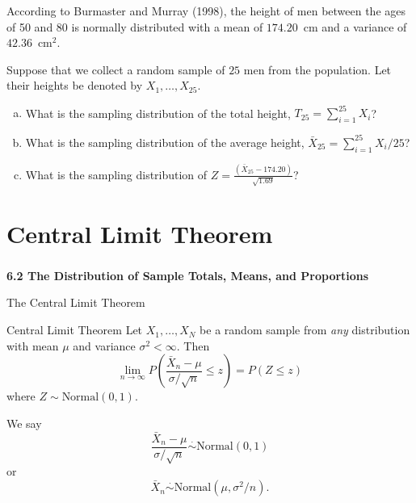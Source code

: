 \begin{frame}

  \begin{block}{\example}
    According to Burmaster and Murray (1998), the height of men between the ages of 50 and 80 is normally distributed with a mean of $174.20$~cm and a variance of $42.36$~cm$^2$.

    \bigskip
    
    Suppose that we collect a random sample of $25$ men from the population. Let their heights be denoted by $X_1,\ldots,X_{25}$. 

    \bigskip
    
    \begin{enumerate}[a)]
    \item What is the sampling distribution of the total height, $T_{25}=\sum_{i=1}^{25} X_i$?
    \item What is the sampling distribution of the average height, $\bar X_{25}=\sum_{i=1}^{25} X_i/25$?
      
    \item What is the sampling distribution of
      $Z=\frac{(\bar X_{25} - 174.20)}{\sqrt{1.69}}$?

    \end{enumerate}
  \end{block}
\end{frame}


\section{Central Limit Theorem}

\begin{frame}
  \frametitle{}
  
  \begin{center}
    \Large{\textbf{6.2 The Distribution of Sample Totals, Means, and Proportions}}

    \bigskip

    The Central Limit Theorem

  \end{center}
  
\end{frame}

\begin{frame}
  \begin{block}{Central Limit Theorem}
    Let $X_1,\ldots,X_N$ be a random sample from \textit{any} distribution with mean $\mu$ and variance $\sigma^2 < \infty$. Then
    \[
      \lim_{n \to \infty}
      P\left(
        \frac{\bar X_n-\mu}{\sigma/\sqrt{n}} \leq z\right)
      = P(Z \leq z)
    \]
    where $Z \sim \mbox{Normal}(0,1)$. 
    
        \medskip
    
    \pause
    
    We say
    $$
    \frac{\bar X_n-\mu}{\sigma/\sqrt{n}} \overset{\cdot}{\sim} \mbox{Normal}(0,1)
    $$
    or
    $$
    \bar X_n \overset{\cdot}{\sim} \mbox{Normal}(\mu,\sigma^2/n).
    $$
  \end{block}
\end{frame}

